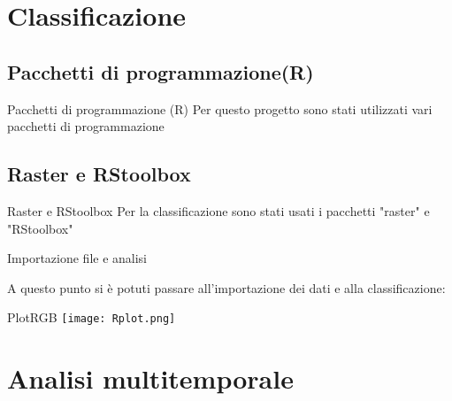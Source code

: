 \documentclass{beamer}
\begin{document}


\section{Classificazione}
\subsection{Pacchetti di programmazione(R)}
\begin{frame}{Pacchetti di programmazione (R)}
Per questo progetto sono stati utilizzati vari pacchetti di programmazione
\scriptsize 
\end{frame}

\subsection{Raster e  RStoolbox}
\begin{frame}{Raster e  RStoolbox}
Per la classificazione sono stati usati i pacchetti "raster" e "RStoolbox"


\end{frame}


\begin{frame}{Importazione file e analisi}

A questo punto si è potuti passare all'importazione dei dati e alla classificazione:
\bigskip

\scriptsize
    
\end{frame}


\begin{frame}{PlotRGB}
\centering
\texttt{[image: Rplot.png]}
    
\end{frame}

\section{Analisi multitemporale}
\end{document}
